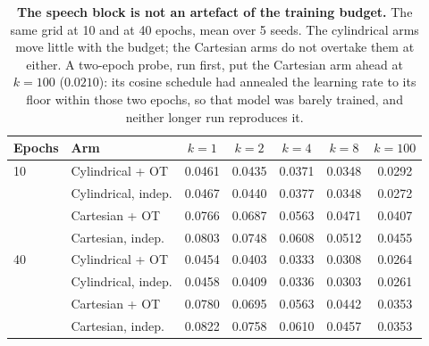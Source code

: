 \begin{table}[h]
    \centering
    \caption{\textbf{The speech block is not an artefact of the training budget.} The same
    grid at 10 and at 40 epochs, mean over 5 seeds. The cylindrical arms move little with
    the budget; the Cartesian arms do not overtake them at either. A two-epoch probe, run
    first, put the Cartesian arm ahead at $k=100$ ($0.0210$): its cosine schedule had
    annealed the learning rate to its floor within those two epochs, so that model was
    barely trained, and neither longer run reproduces it.}
    \label{tab:audio_epochs}
    \vspace{1mm}
    \begin{tabular}{llccccc}
        \toprule
        \textbf{Epochs} & \textbf{Arm} & $k=1$ & $k=2$ & $k=4$ & $k=8$ & $k=100$ \\
        \midrule
        10
          & Cylindrical + OT       & 0.0461 & 0.0435 & 0.0371 & 0.0348 & 0.0292 \\
          & Cylindrical, indep.    & 0.0467 & 0.0440 & 0.0377 & 0.0348 & 0.0272 \\
          & Cartesian + OT         & 0.0766 & 0.0687 & 0.0563 & 0.0471 & 0.0407 \\
          & Cartesian, indep.      & 0.0803 & 0.0748 & 0.0608 & 0.0512 & 0.0455 \\
        \midrule
        40
          & Cylindrical + OT       & 0.0454 & 0.0403 & 0.0333 & 0.0308 & 0.0264 \\
          & Cylindrical, indep.    & 0.0458 & 0.0409 & 0.0336 & 0.0303 & 0.0261 \\
          & Cartesian + OT         & 0.0780 & 0.0695 & 0.0563 & 0.0442 & 0.0353 \\
          & Cartesian, indep.      & 0.0822 & 0.0758 & 0.0610 & 0.0457 & 0.0353 \\
        \bottomrule
    \end{tabular}
    \vspace{1mm}
\end{table}
